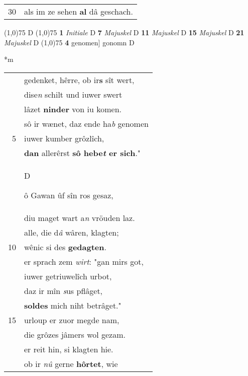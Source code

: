 \documentclass[8pt,a4paper,notitlepage]{article}
\begin{document}
\begin{table}[ht]
\begin{minipage}[t]{0.5\linewidth}
\begin{tabular}{rl}
30 & als im ze sehen \textbf{al} dâ geschach.\\ 
\end{tabular}
\scriptsize
\line(1,0){75} \newline
D \newline
\line(1,0){75} \newline
\textbf{1} \textit{Initiale} D  \textbf{7} \textit{Majuskel} D  \textbf{11} \textit{Majuskel} D  \textbf{15} \textit{Majuskel} D  \textbf{21} \textit{Majuskel} D  \newline
\line(1,0){75} \newline
\textbf{4} genomen] gonomn D \newline
\end{minipage}
\hspace{0.5cm}
\begin{minipage}[t]{0.5\linewidth}
\small
\begin{center}*m
\end{center}
\begin{tabular}{rl}
 & gedenket, hêrre, ob ir\textbf{s} sît wert,\\ 
 & dise\textit{n} schilt und iuwer swert\\ 
 & lâzet \textbf{ninder} von iu komen.\\ 
 & sô ir wænet, daz ende ha\textit{b} genomen\\ 
5 & iuwer kumber grôzlîch,\\ 
 & \textbf{dan} allerêrst \textbf{sô hebe\textit{t} er sich}."\\ 
 & \begin{large}D\end{large}ô Gawan ûf sîn ros gesaz,\\ 
 & diu maget wart a\textit{n} vröuden laz.\\ 
 & alle, die d\textit{â} wâren, klagten;\\ 
10 & wênic si des \textbf{gedagten}.\\ 
 & er sprach zem \textit{wirt}: "gan mirs got,\\ 
 & iuwer getriuwelîch urbot,\\ 
 & daz ir mîn \textit{s}us pflâget,\\ 
 & \textbf{soldes} mich niht betrâget."\\ 
15 & urloup er zuor megde nam,\\ 
 & die grôzes jâmers wol gezam.\\ 
 & er reit hin, si klagten hie.\\ 
 & ob ir \textit{nû} gerne \textbf{hôrtet}, wie\\ 

\end{tabular}
\end{minipage}
\end{table}
\end{document}
